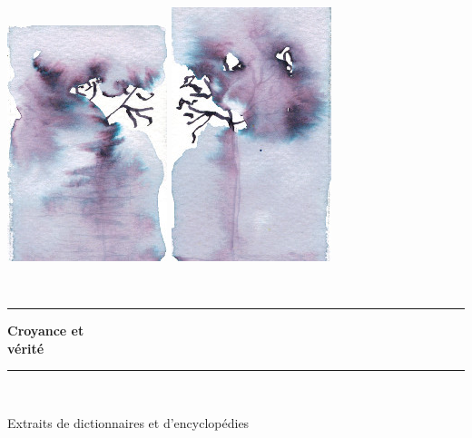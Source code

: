 \begin{titlepage}
%
\newcommand{\HRule}{\rule{\linewidth}{0.5mm}}

\begin{center}
\includegraphics[scale=0.5]{./presentation/gauche}
\hspace{1cm}
\includegraphics[scale=0.5]{./presentation/droite}
\end{center}

\textsc{\Large }\\[0.5cm]

\HRule

\begin{center}
{\huge \bfseries  Croyance et\\
vérité\\[0.4cm] }
\end{center}

\HRule \\[1.5cm]


\vfill

\hfill
\begin{minipage}{0.4\textwidth}
\begin{flushright} \large
Extraits de dictionnaires et d'encyclopédies
\end{flushright}
\end{minipage}


\end{titlepage}
